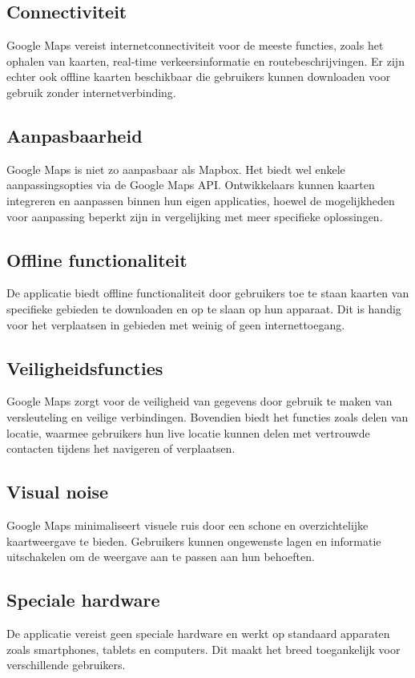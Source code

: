 \subsection*{Connectiviteit}
Google Maps vereist internetconnectiviteit voor de meeste functies, zoals het ophalen van kaarten, real-time verkeersinformatie en routebeschrijvingen. Er zijn echter ook offline kaarten beschikbaar die gebruikers kunnen downloaden voor gebruik zonder internetverbinding.

\subsection*{Aanpasbaarheid}
Google Maps is niet zo aanpasbaar als Mapbox. Het biedt wel enkele aanpassingsopties via de Google Maps API. Ontwikkelaars kunnen kaarten integreren en aanpassen binnen hun eigen applicaties, hoewel de mogelijkheden voor aanpassing beperkt zijn in vergelijking met meer specifieke oplossingen.

\subsection*{Offline functionaliteit}
De applicatie biedt offline functionaliteit door gebruikers toe te staan kaarten van specifieke gebieden te downloaden en op te slaan op hun apparaat. Dit is handig voor het verplaatsen in gebieden met weinig of geen internettoegang.

\subsection*{Veiligheidsfuncties}
Google Maps zorgt voor de veiligheid van gegevens door gebruik te maken van versleuteling en veilige verbindingen. Bovendien biedt het functies zoals delen van locatie, waarmee gebruikers hun live locatie kunnen delen met vertrouwde contacten tijdens het navigeren of verplaatsen.

\subsection*{Visual noise}
Google Maps minimaliseert visuele ruis door een schone en overzichtelijke kaartweergave te bieden. Gebruikers kunnen ongewenste lagen en informatie uitschakelen om de weergave aan te passen aan hun behoeften.

\subsection*{Speciale hardware}
De applicatie vereist geen speciale hardware en werkt op standaard apparaten zoals smartphones, tablets en computers. Dit maakt het breed toegankelijk voor verschillende gebruikers.


